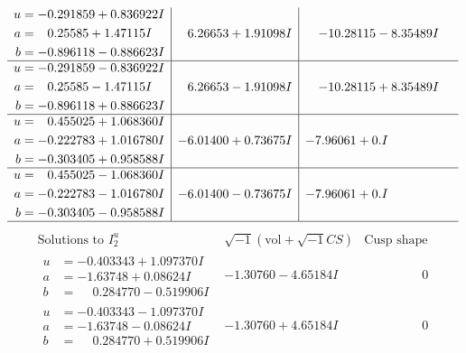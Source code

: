 \documentclass[1p]{elsarticle_modified}
\theoremstyle{definition}
\newcommand{\I}{\sqrt{-1}}
\begin{document}
$$\begin{array}{c|c|c}
\begin{aligned}
u &= -0.291859 + 0.836922 I \\
a &= \phantom{-}0.25585 + 1.47115 I \\
b &= -0.896118 - 0.886623 I\end{aligned}
 & \phantom{-}6.26653 + 1.91098 I & -10.28115 - 8.35489 I \\ \hline\begin{aligned}
u &= -0.291859 - 0.836922 I \\
a &= \phantom{-}0.25585 - 1.47115 I \\
b &= -0.896118 + 0.886623 I\end{aligned}
 & \phantom{-}6.26653 - 1.91098 I & -10.28115 + 8.35489 I \\ \hline\begin{aligned}
u &= \phantom{-}0.455025 + 1.068360 I \\
a &= -0.222783 + 1.016780 I \\
b &= -0.303405 + 0.958588 I\end{aligned}
 & -6.01400 + 0.73675 I & -7.96061 + 0. I\phantom{ +0.000000I} \\ \hline\begin{aligned}
u &= \phantom{-}0.455025 - 1.068360 I \\
a &= -0.222783 - 1.016780 I \\
b &= -0.303405 - 0.958588 I\end{aligned}
 & -6.01400 - 0.73675 I & -7.96061 + 0. I\phantom{ +0.000000I}\\
 \hline 
 \end{array}$$\newpage$$\begin{array}{c|c|c}  
\text{Solutions to }I^u_{2}& \I (\text{vol} + \sqrt{-1}CS) & \text{Cusp shape}\\
 \hline 
\begin{aligned}
u &= -0.403343 + 1.097370 I \\
a &= -1.63748 + 0.08624 I \\
b &= \phantom{-}0.284770 - 0.519906 I\end{aligned}
 & -1.30760 - 4.65184 I & \phantom{-0.000000 } 0 \\ \hline\begin{aligned}
u &= -0.403343 - 1.097370 I \\
a &= -1.63748 - 0.08624 I \\
b &= \phantom{-}0.284770 + 0.519906 I\end{aligned}
 & -1.30760 + 4.65184 I & \phantom{-0.000000 } 0 \\ \hline\begin{aligned}

\end{aligned}
\end{array}$$
\end{document}
